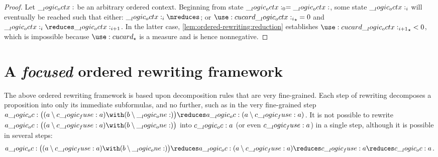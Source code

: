 %
\begin{proof}
  Let $\__logic_octx:$ be an arbitrary ordered context.
  Beginning from state $\__logic_octx:_0 = \__logic_octx:$, some state $\__logic_octx:_i$ will eventually be reached such that either: $\octx_i \nreduces$; or $\card{\octx_i}_{\star} = 0$ and $\octx_i \reduces \octx_{i+1}$.
  In the latter case, \cref{lem:ordered-rewriting:reduction} establishes $\card{\octx_{i+1}}_{\star} < 0$, which is impossible because $\card{}_{\star}$ is a measure  and is hence nonnegative.
\end{proof}




\section{A \emph{focused} ordered rewriting framework}\label{sec:ordered-rewriting:focused}

The above ordered rewriting framework is based upon decomposition rules that are very fine-grained.
Each step of rewriting decomposes a proposition into only its immediate subformulas, and no further, such as in the very fine-grained step $a \oc \bigl((a \limp c \fuse a) \with (b \limp \one)\bigr) \reduces a \oc (a \limp c \fuse a)$.
It is not possible to rewrite $a \oc \bigl((a \limp c \fuse a) \with (b \limp \one)\bigr)$ into $c \__logic_oc: a$ (or even $c \__logic_fuse: a$) in a single step, although it is possible in several steps:%
\begin{equation*}
  a \oc \bigl((a \limp c \fuse a) \with (b \limp \one)\bigr) \reduces a \oc (a \limp c \fuse a) \reduces c \fuse a \reduces c \oc a
  \,.
\end{equation*}

